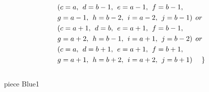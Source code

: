 \begin{align*}
&(c = a ,\hspace{1ex}d = b-1,\hspace{1ex}e=a-1,\hspace{1ex}f=b-1,
\\&g=a-1,\hspace{1ex}h=b-2,\hspace{1ex}i=a-2,\hspace{1ex}j=b-1)\hspace{1ex} or \\
&(c = a+1 ,\hspace{1ex}d = b,\hspace{1ex}e=a+1,\hspace{1ex}f=b-1,
\\&g=a+2,\hspace{1ex}h=b-1,\hspace{1ex}i=a+1,\hspace{1ex}j=b-2)\hspace{1ex} or \\
&(c = a ,\hspace{1ex}d = b+1,\hspace{1ex}e=a+1,\hspace{1ex}f=b+1,
\\&g=a+1,\hspace{1ex}h=b+2,\hspace{1ex}i=a+2,\hspace{1ex}j=b+1)\hspace{3ex}\}
\end{align*}  
\\ piece Blue1 
